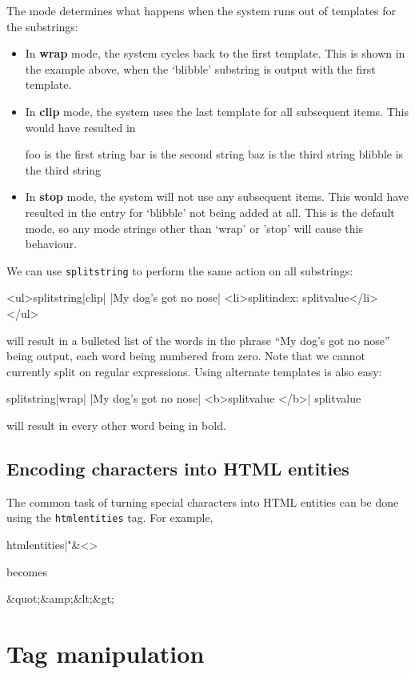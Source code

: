 The mode determines what happens when the system runs out of templates for the substrings:
\begin{itemize}
\item In \textbf{wrap} mode, the system cycles back to the first template. This is shown in the example
above, when the `blibble' substring is output with the first template.
\item In \textbf{clip} mode, the system uses the last template for all subsequent items. This would
have resulted in
\begin{MyVerbatim}
foo is the first string bar is the second string
baz is the third string blibble is the third string
\end{MyVerbatim}
\item In \textbf{stop} mode, the system will not use any subsequent items. This would have resulted in
the entry for `blibble' not being added at all. This is the default mode, so any mode strings other
than `wrap' or 'stop' will cause this behaviour.
\end{itemize}
We can use \texttt{splitstring} to perform the same action on all substrings:
\begin{MyVerbatim}
<ul>{{splitstring|clip| |My dog's got no nose|
    <li>{{splitindex}}: {{splitvalue}}</li>}}</ul>
\end{MyVerbatim}
will result in a bulleted list of the words in the phrase ``My dog's got no nose'' being output,
each word being numbered from zero. Note that we cannot currently split on regular expressions.
Using alternate templates is also easy:
\begin{MyVerbatim}
{{splitstring|wrap| |My dog's got no nose|
    <b>{{splitvalue}} </b>|
    {{splitvalue}} }}
\end{MyVerbatim}
will result in every other word being in bold.

\subsection{Encoding characters into HTML entities}
The common task of turning special characters into HTML entities can be done using the \texttt{htmlentities} tag. For example,
\begin{MyVerbatim}
{{htmlentities|"&<>}}
\end{MyVerbatim}
becomes
\begin{MyVerbatim}
&quot;&amp;&lt;&gt;
\end{MyVerbatim}


\section{Tag manipulation}
